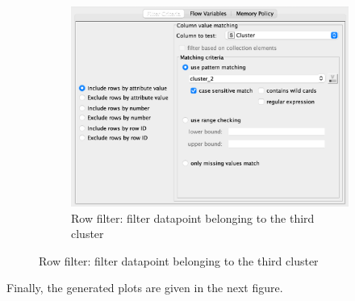 \documentclass[11pt]{article}
\begin{document}
\begin{figure}[H]
\begin{subfigure}{0.4\textwidth}
					\includegraphics[width=\textwidth]{res/t1/t14/t14-row-filter-3-conf}
					\caption{Row filter: filter datapoint belonging to the third cluster}
					\label{fig:third}
				\end{subfigure}	
				\label{fig:figures}
			\end{figure}
			\fi
			Finally, the generated plots are given in the next figure.
			\iffalse
\end{document}
